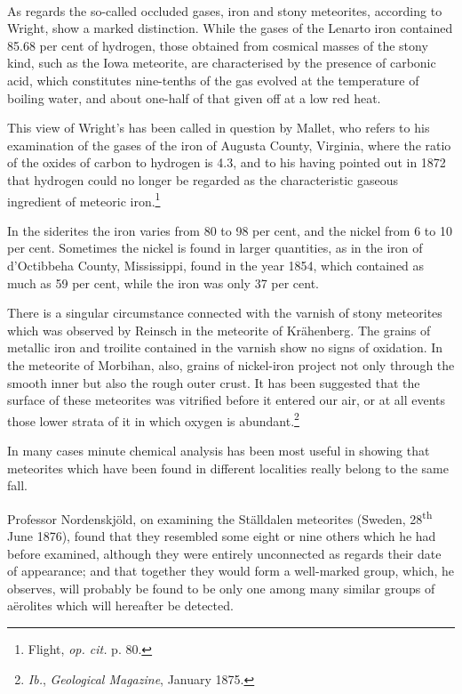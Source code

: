 \documentclass[a4paper, 12pt, oneside, polutonikogreek, english]{article}
\begin{document}
\paragraph{}
As regards the so-called occluded gases, iron and stony meteorites, according to Wright, show a marked distinction. While the gases of the Lenarto iron contained 85.68 per cent of hydrogen, those obtained from cosmical masses of the stony kind, such as the Iowa meteorite, are characterised by the presence of carbonic acid, which constitutes nine-tenths of the gas evolved at the temperature of boiling water, and about one-half of that given off at a low red heat.

This view of Wright's has been called in question by Mallet, who refers to his examination of the gases of the iron of Augusta County, Virginia, where the ratio of the oxides of carbon to hydrogen is 4.3, and to his having pointed out in 1872 that hydrogen could no longer be regarded as the characteristic gaseous ingredient of meteoric iron.\footnote{Flight, \emph{op. cit.} p. 80.}

In the siderites the iron varies from 80 to 98 per cent, and the nickel from 6 to 10 per cent. Sometimes the nickel is found in larger quantities, as in the iron of d'Octibbeha County, Mississippi, found in the year 1854, which contained as much as 59 per cent, while the iron was only 37 per cent.

There is a singular circumstance connected with the varnish of stony meteorites which was observed by Reinsch in the meteorite of Krähenberg. The grains of metallic iron and troilite contained in the varnish show no signs of oxidation. In the meteorite of Morbihan, also, grains of nickel-iron project not only through the smooth inner but also the rough outer crust. It has been suggested that the surface of these meteorites was vitrified before it entered our air, or at all events those lower strata of it in which oxygen is abundant.\footnote{\emph{Ib.}, \emph{Geological Magazine}, January 1875.}

In many cases minute chemical analysis has been most useful in showing that meteorites which have been found in different localities really belong to the same fall.

Professor Nordenskjöld, on examining the Ställdalen meteorites (Sweden, 28\textsuperscript{th} June 1876), found that they resembled some eight or nine others which he had before examined, although they were entirely unconnected as regards their date of appearance; and that together they would form a well-marked group, which, he observes, will probably be found to be only one among many similar groups of aërolites which will hereafter be detected.
\end{document}
